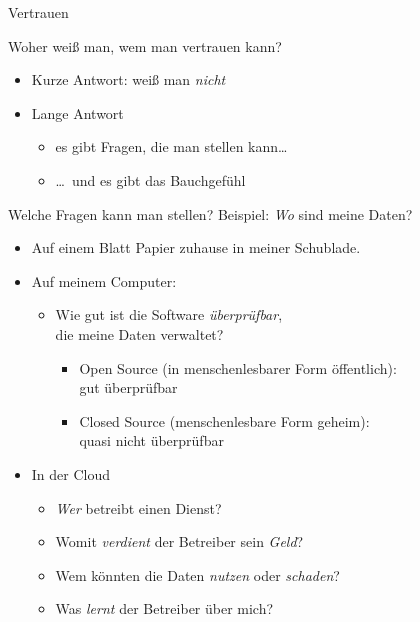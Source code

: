 \begin{frame}{Vertrauen}
  \begin{block}{Woher weiß man, wem man vertrauen kann?}
  \begin{itemize}
    \item Kurze Antwort: weiß man \emph{nicht}
    \item Lange Antwort
    \begin{itemize}
      \item es gibt Fragen, die man stellen kann\ldots
      \item \ldots\ und es gibt das Bauchgefühl
    \end{itemize}
  \end{itemize}
  \end{block}
\end{frame}

\begin{frame}{Welche Fragen kann man stellen?}
  Beispiel: \emph{Wo} sind meine Daten?
  \begin{itemize}
    \item Auf einem Blatt Papier zuhause in meiner Schublade.
    \item Auf meinem Computer:
    \begin{itemize}
      \item Wie gut ist die Software \emph{überprüfbar},\\ die meine Daten verwaltet?
      \begin{itemize}
        \item Open Source (in menschenlesbarer Form öffentlich):\\gut überprüfbar
        \item Closed Source (menschenlesbare Form geheim):\\quasi nicht überprüfbar
      \end{itemize}
    \end{itemize}
    \item In der Cloud
      \begin{itemize}
        \item \emph{Wer} betreibt einen Dienst?
        \item Womit \emph{verdient} der Betreiber sein \emph{Geld}?
        \item Wem könnten die Daten \emph{nutzen} oder \emph{schaden}?
        \item Was \emph{lernt} der Betreiber über mich?
      \end{itemize}
  \end{itemize}
\end{frame}

